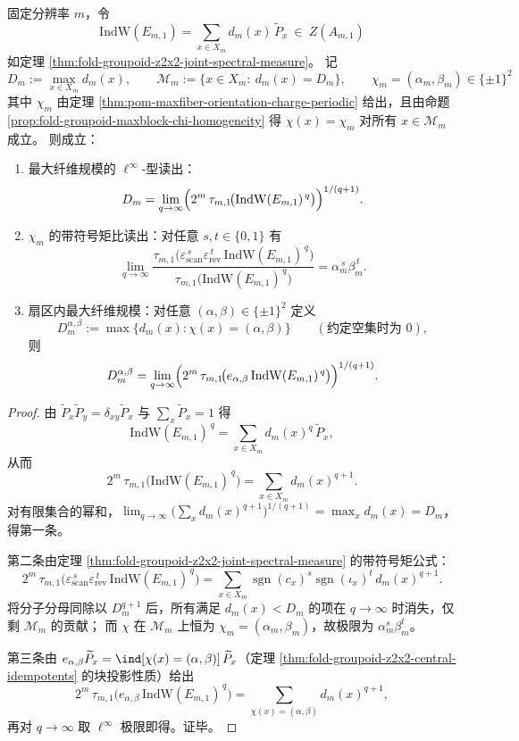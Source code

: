 \begin{corollary}\label{cor:fold-indw-high-q-extract-maxfiber-and-chi}
固定分辨率 \(m\)，令
\[
\mathrm{IndW}(E_{m,1})=\sum_{x\in X_m}d_m(x)\,\widetilde P_x\ \in\ Z(A_{m,1})
\]
如定理 \ref{thm:fold-groupoid-z2x2-joint-spectral-measure}。
记
\[
D_m:=\max_{x\in X_m}d_m(x),\qquad
\mathcal M_m:=\{x\in X_m:\ d_m(x)=D_m\},
\qquad
\chi_m=(\alpha_m,\beta_m)\in\{\pm1\}^2
\]
其中 \(\chi_m\) 由定理 \ref{thm:pom-maxfiber-orientation-charge-periodic} 给出，且由命题 \ref{prop:fold-groupoid-maxblock-chi-homogeneity} 得 \(\chi(x)=\chi_m\) 对所有 \(x\in\mathcal M_m\) 成立。
则成立：
\begin{enumerate}
\normalfont
  \item 最大纤维规模的 \(\ell^\infty\)-型读出：
  \[
  D_m
  =
  \lim_{q\to\infty}\Bigl(2^m\,\tau_{m,1}\!\bigl(\mathrm{IndW}(E_{m,1})^{\,q}\bigr)\Bigr)^{1/(q+1)}.
  \]
  \item \(\chi_m\) 的带符号矩比读出：对任意 \(s,t\in\{0,1\}\) 有
  \[
  \lim_{q\to\infty}
  \frac{\tau_{m,1}\!\bigl(\varepsilon_{\mathrm{scan}}^{\,s}\varepsilon_{\mathrm{rev}}^{\,t}\,\mathrm{IndW}(E_{m,1})^{\,q}\bigr)}
  {\tau_{m,1}\!\bigl(\mathrm{IndW}(E_{m,1})^{\,q}\bigr)}
  =
  \alpha_m^{\,s}\beta_m^{\,t}.
  \]
  \item 扇区内最大纤维规模：对任意 \((\alpha,\beta)\in\{\pm1\}^2\) 定义
  \[
  D_m^{\alpha,\beta}:=\max\{d_m(x):\chi(x)=(\alpha,\beta)\}\qquad(\text{约定空集时为 }0),
  \]
  则
  \[
  D_m^{\alpha,\beta}
  =
  \lim_{q\to\infty}\Bigl(2^m\,\tau_{m,1}\!\bigl(e_{\alpha,\beta}\,\mathrm{IndW}(E_{m,1})^{\,q}\bigr)\Bigr)^{1/(q+1)}.
  \]
\end{enumerate}
\end{corollary}
\begin{proof}
由 \(\widetilde P_x\widetilde P_y=\delta_{xy}\widetilde P_x\) 与 \(\sum_x\widetilde P_x=1\) 得
\[
\mathrm{IndW}(E_{m,1})^{\,q}=\sum_{x\in X_m} d_m(x)^{q}\,\widetilde P_x,
\]
从而
\[
2^m\,\tau_{m,1}\!\bigl(\mathrm{IndW}(E_{m,1})^{\,q}\bigr)
=
\sum_{x\in X_m}d_m(x)^{q+1}.
\]
对有限集合的幂和，\(\lim_{q\to\infty}\bigl(\sum_x d_m(x)^{q+1}\bigr)^{1/(q+1)}=\max_x d_m(x)=D_m\)，得第一条。
\par
第二条由定理 \ref{thm:fold-groupoid-z2x2-joint-spectral-measure} 的带符号矩公式：
\[
2^m\,\tau_{m,1}\!\bigl(\varepsilon_{\mathrm{scan}}^{\,s}\varepsilon_{\mathrm{rev}}^{\,t}\,\mathrm{IndW}(E_{m,1})^{\,q}\bigr)
=
\sum_{x\in X_m}\operatorname{sgn}(c_x)^s\operatorname{sgn}(\iota_x)^t\,d_m(x)^{q+1}.
\]
将分子分母同除以 \(D_m^{q+1}\) 后，所有满足 \(d_m(x)<D_m\) 的项在 \(q\to\infty\) 时消失，仅剩 \(\mathcal M_m\) 的贡献；
而 \(\chi\) 在 \(\mathcal M_m\) 上恒为 \(\chi_m=(\alpha_m,\beta_m)\)，故极限为 \(\alpha_m^s\beta_m^t\)。
\par
第三条由 \(e_{\alpha,\beta}\widetilde P_x=\ind[\chi(x)=(\alpha,\beta)]\,\widetilde P_x\)（定理 \ref{thm:fold-groupoid-z2x2-central-idempotents} 的块投影性质）给出
\[
2^m\,\tau_{m,1}\!\bigl(e_{\alpha,\beta}\,\mathrm{IndW}(E_{m,1})^{\,q}\bigr)
=
\sum_{\chi(x)=(\alpha,\beta)} d_m(x)^{q+1},
\]
再对 \(q\to\infty\) 取 \(\ell^\infty\) 极限即得。证毕。
\end{proof}

